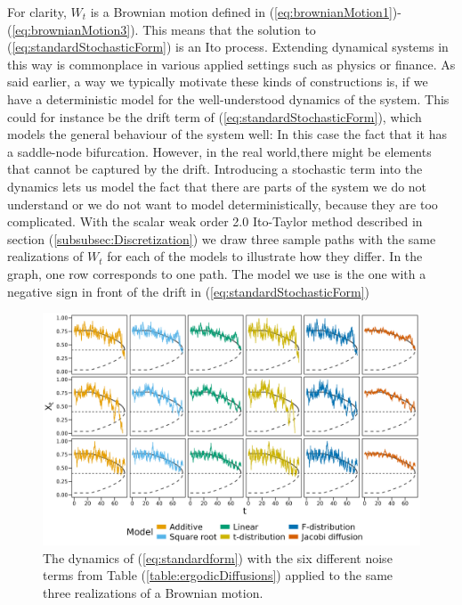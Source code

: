 For clarity, $W_t$ is a Brownian motion defined in (\ref{eq:brownianMotion1})-(\ref{eq:brownianMotion3}). This means that the solution to (\ref{eq:standardStochasticForm}) is an Ito process. Extending dynamical systems in this way is commonplace in various applied settings such as physics or finance. As said earlier, a way we typically motivate these kinds of constructions is, if we have a deterministic model for the well-understood dynamics of the system. This could for instance be the drift term of (\ref{eq:standardStochasticForm}), which models the general behaviour of the system well: In this case the fact that it has a saddle-node bifurcation. However, in the real world,there might be elements that cannot be captured by the drift. Introducing a stochastic term into the dynamics lets us model the fact that there are parts of the system we do not understand or we do not want to model deterministically, because they are too complicated.\newpage
\noindent With the scalar weak order 2.0 Ito-Taylor method described in section (\ref{subsubsec:Discretization}) we draw three sample paths with the same realizations of $W_t$ for each of the models to illustrate how they differ. In the graph, one row corresponds to one path. The model we use is the one with a negative sign in front of the drift in (\ref{eq:standardStochasticForm})
\begin{figure}[h]
    \begin{center}
        \includegraphics[scale = .1]{figures/sample_paths_plot_small_scale.jpeg}
        \caption{The dynamics of (\ref{eq:standardform}) with the six different noise terms from Table (\ref{table:ergodicDiffusions}) applied to the same three realizations of a Brownian motion.}
        \label{figure:samplesFromAllDifferentModels}
    \end{center}
\end{figure}\\
